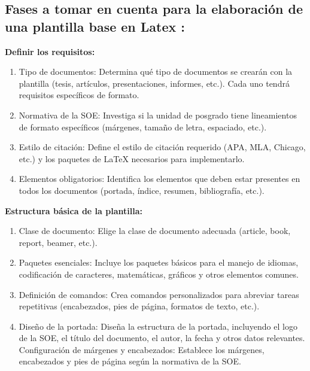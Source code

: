 \documentclass[10pt]{article}
\begin{document}
    \subsection{Fases a tomar en cuenta para la elaboración de una plantilla base en Latex :}
    
{\raggedleft \textbf{Definir los requisitos:}}
    \begin{enumerate}
        \item Tipo de documentos: Determina qué tipo de documentos se crearán con la plantilla (tesis, artículos, presentaciones, informes, etc.). Cada uno tendrá requisitos específicos de formato.
        \item Normativa de la SOE: Investiga si la unidad de posgrado tiene lineamientos de formato específicos (márgenes, tamaño de letra, espaciado, etc.).
        \item Estilo de citación: Define el estilo de citación requerido (APA, MLA, Chicago, etc.) y los paquetes de LaTeX necesarios para implementarlo.
        \item Elementos obligatorios: Identifica los elementos que deben estar presentes en todos los documentos (portada, índice, resumen, bibliografía, etc.).
    \end{enumerate}
    
{\raggedleft \textbf{Estructura básica de la plantilla:}}
    \begin{enumerate}
        \item Clase de documento: Elige la clase de documento adecuada (article, book, report, beamer, etc.).
        \item Paquetes esenciales: Incluye los paquetes básicos para el manejo de idiomas, codificación de caracteres, matemáticas, gráficos y otros elementos comunes.
        \item Definición de comandos: Crea comandos personalizados para abreviar tareas repetitivas (encabezados, pies de página, formatos de texto, etc.).
        \item Diseño de la portada: Diseña la estructura de la portada, incluyendo el logo de la SOE, el título del documento, el autor, la fecha y otros datos relevantes.
    Configuración de márgenes y encabezados: Establece los márgenes, encabezados y pies de página según la normativa de la SOE.
    \end{enumerate}
\end{document}
